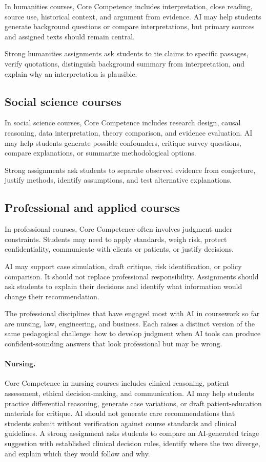 \documentclass{SIAMbook2023}
\begin{document}
In humanities courses, Core Competence includes interpretation, close reading, source use, historical context, and argument from evidence. AI may help students generate background questions or compare interpretations, but primary sources and assigned texts should remain central.

Strong humanities assignments ask students to tie claims to specific passages, verify quotations, distinguish background summary from interpretation, and explain why an interpretation is plausible.

\subsection{Social science courses}
\label{i:subsec:social-sciences}

In social science courses, Core Competence includes research design, causal reasoning, data interpretation, theory comparison, and evidence evaluation. AI may help students generate possible confounders, critique survey questions, compare explanations, or summarize methodological options.

Strong assignments ask students to separate observed evidence from conjecture, justify methods, identify assumptions, and test alternative explanations.

\subsection{Professional and applied courses}
\label{i:subsec:professional}

In professional courses, Core Competence often involves judgment under constraints. Students may need to apply standards, weigh risk, protect confidentiality, communicate with clients or patients, or justify decisions.

AI may support case simulation, draft critique, risk identification, or policy comparison. It should not replace professional responsibility. Assignments should ask students to explain their decisions and identify what information would change their recommendation.

The professional disciplines that have engaged most with AI in coursework so far are nursing, law, engineering, and business. Each raises a distinct version of the same pedagogical challenge: how to develop judgment when AI tools can produce confident-sounding answers that look professional but may be wrong.

\paragraph{Nursing.} Core Competence in nursing courses includes clinical reasoning, patient assessment, ethical decision-making, and communication. AI may help students practice differential reasoning, generate case variations, or draft patient-education materials for critique. AI should not generate care recommendations that students submit without verification against course standards and clinical guidelines. A strong assignment asks students to compare an AI-generated triage suggestion with established clinical decision rules, identify where the two diverge, and explain which they would follow and why.
\end{document}
